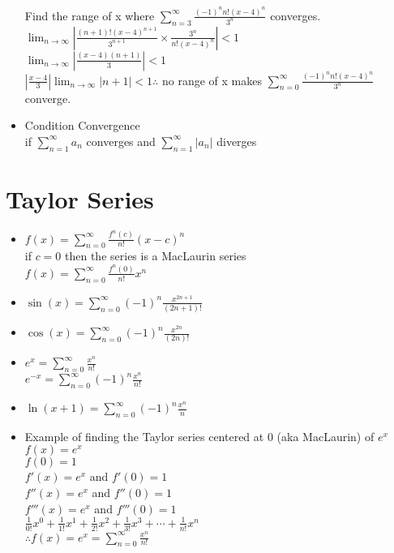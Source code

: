\documentclass{article}
\begin{document}
\begin{itemize}
      Find the range of x where
      \(\sum\limits_{n=3}^{\infty}\frac{(-1)^nn!(x-4)^n}{3^n}\)
      converges.\\
      \(\lim_{n\rightarrow\infty}\left|\frac{(n+1)!(x-4)^{n+1}}{3^{n+1}}
      \times \frac{3^n}{n!(x-4)^n}\right|<1\)\\
      \( \lim_{n\rightarrow\infty}\left| \frac{(x-4)(n+1)}{3}
      \right|<1\) \\
      \( \left| \frac{x-4}{3} \right|
      \lim_{n\rightarrow\infty} \left| n+1 \right|<1 \therefore \)
      no range of x makes \(
      \sum\limits_{n=0}^{\infty}\frac{(-1)^nn!(x-4)^n}{3^n}\)
      converge.\\
    \item Condition Convergence\\
      \subitem if \( \sum\limits_{n=1}^{\infty} a_n \) converges
      and \( \sum\limits_{n=1}^{\infty} \left| a_n \right| \)
      diverges\\
  \end{itemize}
\section*{Taylor Series}
  \begin{itemize}
    \item \(
      f(x)=\sum\limits_{n=0}^{\infty}\frac{f^n(c)}{n!}(x-c)^n\)\\
      if \(c=0\) then the series is a MacLaurin series\\
      \subitem
      \(f(x)=\sum\limits_{n=0}^{\infty}\frac{f^n(0)}{n!}x^n\)\\
    \item  \(\sin(x)=\sum\limits_{n=0}^{\infty} (-1)^n
      \frac{x^{2n+1}}{(2n+1)!}\)\\
    \item \(\cos(x)=\sum\limits_{n=0}^{\infty}(-1)^n\frac{x^{2n}}{(2n)!}
     \)\\
    \item\( e^x=\sum\limits_{n=0}^{\infty}\frac{x^n}{n!} \)\\
      \subitem \( e^{-x}=\sum\limits_{n=0}^{\infty}(-1)^n
      \frac{x^n}{n!} \)\\
    \item \(\ln(x+1)=\sum\limits_{n=0}^{\infty}(-1)^n\frac{x^n}{n}\)\\
    \item Example of finding the Taylor series centered at 0 (aka
      MacLaurin) of \(e^x\)\\
      \subitem \(f(x)=e^x\)\\
      \subitem \(f(0)=1\)\\
      \(f'(x)=e^x\) and \(f'(0)=1\)\\
      \(f''(x)=e^x\) and \(f''(0)=1\)\\
      \(f'''(x)=e^x\) and \(f'''(0)=1\)\\
      \(\frac{1}{0!}x^0+\frac{1}{1!}x^1+\frac{1}{2!}x^2+\frac{1}{3!}x^3+\cdots+\frac{1}{n!}x^n\)\\
      \(\therefore f(x)=e^x=\sum\limits_{n=0}^{\infty}
      \frac{x^n}{n!}\)\\
  \end{itemize}
\end{document}
